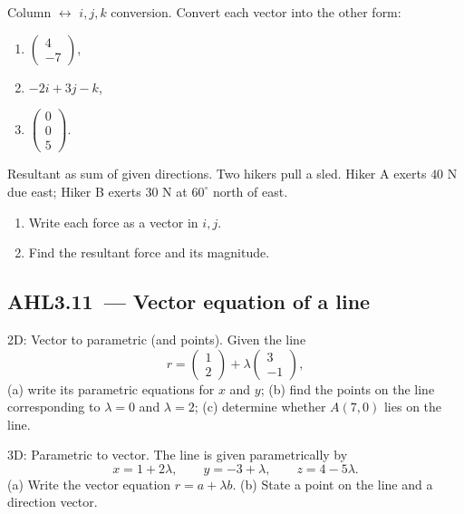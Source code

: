 \documentclass[11pt]{article}
\def\textbf#1{#1}%
\def\mathbf#1{#1}%
\newcommand{\tocsubsection}[1]{\subsection{#1}}
\newcounter{question}
\begin{document}
\begin{question}
\textbf{Column $\leftrightarrow$ $\mathbf{i},\mathbf{j},\mathbf{k}$ conversion.}
Convert each vector into the other form:
\begin{enumerate}
  \item $\begin{pmatrix}4\\-7\end{pmatrix}$,
  \item $-2\mathbf{i}+3\mathbf{j}-\mathbf{k}$,
  \item $\begin{pmatrix}0\\0\\5\end{pmatrix}$.
\end{enumerate}
\end{question}

\begin{question}
\textbf{Resultant as sum of given directions.}
Two hikers pull a sled. Hiker A exerts $40$ N due east; Hiker B exerts $30$ N at $60^\circ$ north of east.
\begin{enumerate}
  \item Write each force as a vector in $\mathbf{i},\mathbf{j}$.
  \item Find the resultant force and its magnitude.
\end{enumerate}
\end{question}



\tocsubsection{AHL3.11 — Vector equation of a line}


\begin{question}
\textbf{2D: Vector to parametric (and points).}
Given the line
\[
\mathbf{r}=\begin{pmatrix}1\\2\end{pmatrix}+\lambda\begin{pmatrix}3\\-1\end{pmatrix},
\]
(a) write its parametric equations for $x$ and $y$; (b) find the points on the line corresponding to $\lambda=0$ and $\lambda=2$; (c) determine whether $A(7,0)$ lies on the line.
\end{question}

\begin{question}
\textbf{3D: Parametric to vector.}
The line is given parametrically by
\[
x=1+2\lambda,\qquad y=-3+\lambda,\qquad z=4-5\lambda.
\]
(a) Write the vector equation $\mathbf{r}=\mathbf{a}+\lambda\mathbf{b}$. (b) State a point on the line and a direction vector.
\end{question}
\end{document}
